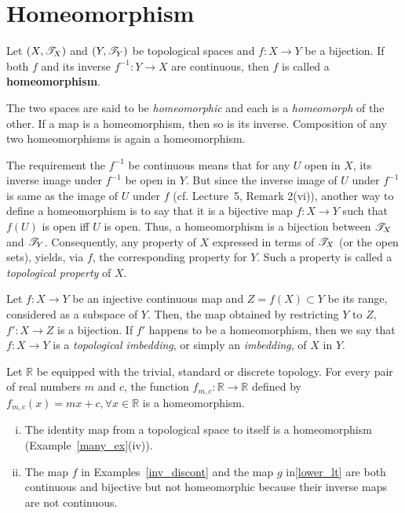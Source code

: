 \documentclass[a4paper,english,12pt]{article}
\begin{document}
\section{Homeomorphism}

\begin{defn}[Homeomorphism] Let $(X,\mathscr{T}_X)$ and $(Y,\mathscr{T}_Y)$ be topological spaces and $f:X\to Y$ be a bijection. If both $f$ and its inverse $f^{-1}:Y\to 
X$ are continuous, then $f$ is called a \textbf{homeomorphism}.
\end{defn}

The two spaces are said to be \textit{homeomorphic} and each is a \textit{homeomorph} of the other. If a map is a homeomorphism, then so is its inverse. Composition of any two homeomorphisms is again a homeomorphism.

The requirement the $f^{-1}$ be continuous means that for any $U$ open in $X$, its inverse image under $f^{-1}$ be open in $Y$. But since the inverse image of $U$ under $f^{-1}$ is same as the image of $U$ under $f$ (cf. Lecture~5, Remark 2(vi)), another way to define a homeomorphism is to say that it is a bijective map $f:X\to Y$ such that $f(U)$ is open iff $U$ is open. Thus, a homeomorphism is a bijection between $\mathscr{T}_X$ and $\mathscr{T}_Y$. Consequently, any property of $X$ expressed in terms of $\mathscr{T}_X$ (or the open sets), yields, via $f$, the corresponding property for $Y$. Such a property is called a \textit{topological property} of $X$. %

Let $f:X\to Y$ be an injective continuous map and $Z=f(X)\subset Y$ be its range, considered as a subspace of $Y$. Then, the map obtained by restricting $Y$ to $Z$, $f':X\to Z$ is a bijection. If $f'$ happens to be a homeomorphism, then we say that $f:X\to Y$ is a \textit{topological imbedding}, or simply an \textit{imbedding}, of $X$ in $Y$.

\begin{exmp}
Let $\mathbb{R}$ be equipped with the trivial, standard or discrete topology. For every pair of real numbers $m$ and $c$, the function $f_{m,c}:\mathbb{R}\to\mathbb{R}$ defined by $f_{m,c}(x)=mx+c,\forall x\in\mathbb{R}$ is a homeomorphism.
\end{exmp}

\begin{exmp}\begin{enumerate}[i)]
\item The identity map from a topological space to itself is a homeomorphism (Example~\ref{many_ex}(iv)).
\item The map $f$ in Examples~\ref{inv_discont} and the map $g$ in\ref{lower_lt} are both continuous and bijective but not homeomorphic because their inverse maps are not continuous.
\end{enumerate}
\end{exmp}
\end{document}
